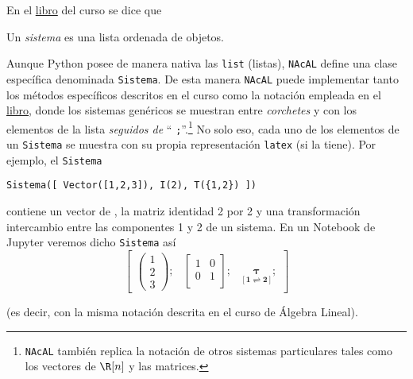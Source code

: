 \documentclass[11pt]{report}
\begin{document}
En el \href{https://mbujosab.github.io/CursoDeAlgebraLineal/libro.pdf\#chapter.1}{libro} del curso se dice que
\begin{center}
  Un \emph{sistema} es una lista ordenada de objetos.
\end{center}
Aunque Python posee de manera nativa las \texttt{list} (listas), \texttt{NAcAL} define una clase específica
denominada \texttt{Sistema}. De esta manera \texttt{NAcAL} puede implementar tanto los métodos específicos
descritos en el curso como la notación empleada en el \href{https://mbujosab.github.io/CursoDeAlgebraLineal/libro.pdf\#chapter.1}{libro}, donde los sistemas genéricos se
muestran entre \emph{corchetes} y con los elementos de la lista \emph{seguidos de} `` \texttt{;}''.\footnote{\texttt{NAcAL}
también replica la notación de otros sistemas particulares tales como los vectores de \(\R[n]\) y las
matrices.} No solo eso, cada uno de los elementos de un \texttt{Sistema} se muestra con su propia
representación \texttt{latex} (si la tiene). Por ejemplo, el \texttt{Sistema}

\begin{verbatim}
Sistema([ Vector([1,2,3]), I(2), T({1,2}) ]) 
\end{verbatim}
contiene un vector de \R[3], la matriz identidad 2 por 2 y una transformación intercambio entre las
componentes 1 y 2 de un sistema. En un Notebook de Jupyter veremos dicho \texttt{Sistema} así
$$\begin{bmatrix}\begin{pmatrix}1\\ 2\\ 3\end{pmatrix};& \left[ \begin{array}{cc}1&0\\0&1\\ \end{array} \right];& \underset{\left[\mathbf{1}\rightleftharpoons\mathbf{2}\right]}{\pmb{\tau}};\end{bmatrix}$$

\noindent
(es decir, con la misma notación descrita en el curso de Álgebra Lineal).
\end{document}
